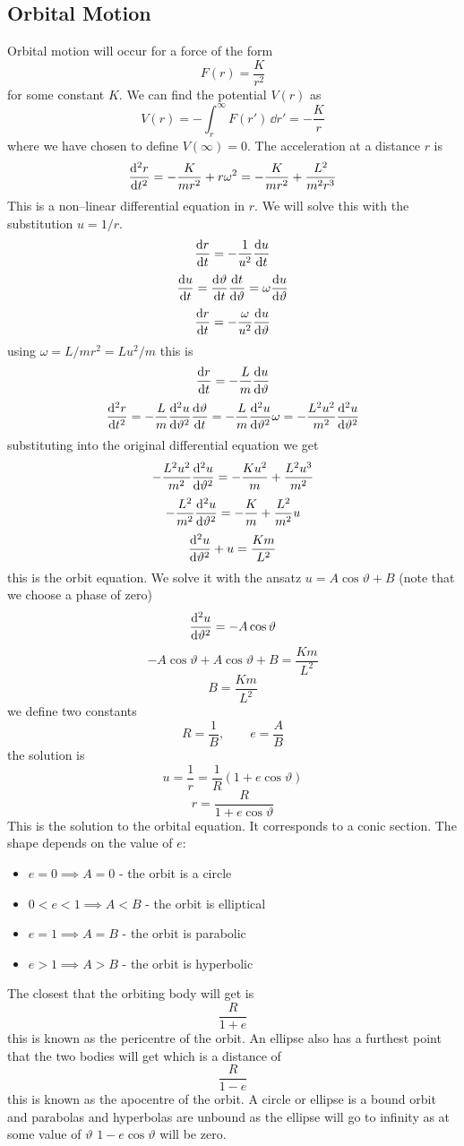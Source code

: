 \documentclass{article}
\begin{document}
    \subsection{Orbital Motion}
    Orbital motion will occur for a force of the form
    \[F(r) = \frac{K}{r^2}\]
    for some constant \(K\).
    We can find the potential \(V(r)\) as
    \[V(r) = -\int_r^\infty F(r')\,\dd r' = -\frac{K}{r}\]
    where we have chosen to define \(V(\infty) = 0\).
    The acceleration at a distance \(r\) is
    \[\dv[2]{r}{t} = -\frac{K}{mr^2} + r\omega^2 = -\frac{K}{mr^2} + \frac{L^2}{m^2r^3}\]
    This is a non--linear differential equation in \(r\).
    We will solve this with the substitution \(u = 1/r\).
    \[\dv{r}{t} = -\frac{1}{u^2}\dv{u}{t}\]
    \[\dv{u}{t} = \dv{\vartheta}{t}\dv{t}{\vartheta} = \omega\dv{u}{\vartheta}\]
    \[\dv{r}{t} = -\frac{\omega}{u^2}\dv{u}{\vartheta}\]
    using \(\omega = L/mr^2 = Lu^2/m\) this is
    \[\dv{r}{t} = -\frac{L}{m}\dv{u}{\vartheta}\]
    \[\dv[2]{r}{t} = -\frac{L}{m}\dv[2]{u}{\vartheta}\dv{\vartheta}{t} = -\frac{L}{m}\dv[2]{u}{\vartheta}\omega = -\frac{L^2u^2}{m^2}\dv[2]{u}{\vartheta}\]
    substituting into the original differential equation we get
    \[-\frac{L^2u^2}{m^2}\dv[2]{u}{\vartheta} = -\frac{Ku^2}{m} + \frac{L^2u^3}{m^2}\]
    \[-\frac{L^2}{m^2}\dv[2]{u}{\vartheta} = -\frac{K}{m} + \frac{L^2}{m^2}u\]
    \[\dv[2]{u}{\vartheta} + u = \frac{Km}{L^2}\]
    this is the orbit equation.
    We solve it with the ansatz \(u = A\cos\vartheta + B\) (note that we choose a phase of zero)
    \[\dv[2]{u}{\vartheta} = -A\cos\vartheta\]
    \[-A\cos\vartheta + A\cos\vartheta + B = \frac{Km}{L^2}\]
    \[B = \frac{Km}{L^2}\]
    we define two constants
    \[R = \frac{1}{B},\qquad e = \frac{A}{B}\]
    the solution is
    \[u = \frac{1}{r} = \frac{1}{R}(1 + e\cos\vartheta)\]
    \[r = \frac{R}{1 + e\cos\vartheta}\]
    This is the solution to the orbital equation.
    It corresponds to a conic section.
    The shape depends on the value of \(e\):
    \begin{itemize}
        \item \(e = 0\implies A = 0\) - the orbit is a circle
        \item \(0 < e < 1\implies A < B\) - the orbit is elliptical
        \item \(e = 1\implies A = B\) - the orbit is parabolic
        \item \(e > 1\implies A > B\) - the orbit is hyperbolic
    \end{itemize}
    The closest that the orbiting body will get is
    \[\frac{R}{1 + e}\]
    this is known as the pericentre of the orbit.
    An ellipse also has a furthest point that the two bodies will get which is a distance of
    \[\frac{R}{1 - e}\]
    this is known as the apocentre of the orbit.
    A circle or ellipse is a bound orbit and parabolas and hyperbolas are unbound as the ellipse will go to infinity as at some value of \(\vartheta\) \(1 - e\cos\vartheta\) will be zero.
\end{document}
